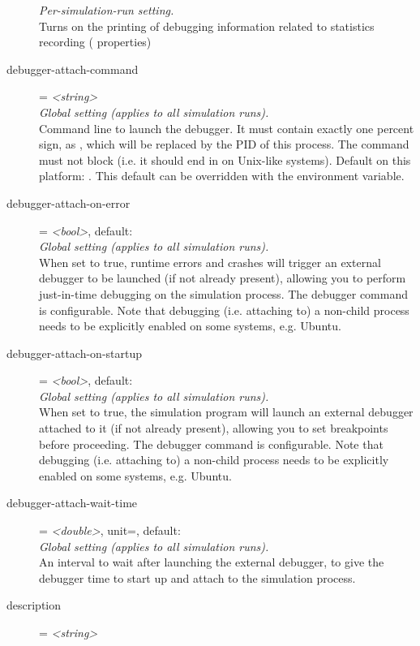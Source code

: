 \begin{description}
    \textit{Per-simulation-run setting.}\\
    Turns on the printing of debugging information related to statistics
    recording ( properties)
\item[debugger-attach-command] = \textit{<string>}\\
    \textit{Global setting (applies to all simulation runs).}\\
    Command line to launch the debugger. It must contain exactly one percent
    sign, as , which will be replaced by the PID of this process. The
    command must not block (i.e. it should end in \ttt{\&} on Unix-like
    systems). Default on this platform: . This default can be overridden with the
     environment variable.
\item[debugger-attach-on-error] = \textit{<bool>}, default: \\
    \textit{Global setting (applies to all simulation runs).}\\
    When set to true, runtime errors and crashes will trigger an external
    debugger to be launched (if not already present), allowing you to perform
    just-in-time debugging on the simulation process. The debugger command is
    configurable. Note that debugging (i.e. attaching to) a non-child process
    needs to be explicitly enabled on some systems, e.g. Ubuntu.
\item[debugger-attach-on-startup] = \textit{<bool>}, default: \\
    \textit{Global setting (applies to all simulation runs).}\\
    When set to true, the simulation program will launch an external debugger
    attached to it (if not already present), allowing you to set breakpoints
    before proceeding. The debugger command is configurable. Note that
    debugging (i.e. attaching to) a non-child process needs to be explicitly
    enabled on some systems, e.g. Ubuntu.
\item[debugger-attach-wait-time] = \textit{<double>}, unit=, default: \\
    \textit{Global setting (applies to all simulation runs).}\\
    An interval to wait after launching the external debugger, to give the
    debugger time to start up and attach to the simulation process.
\item[description] = \textit{<string>}\\

\end{description}
